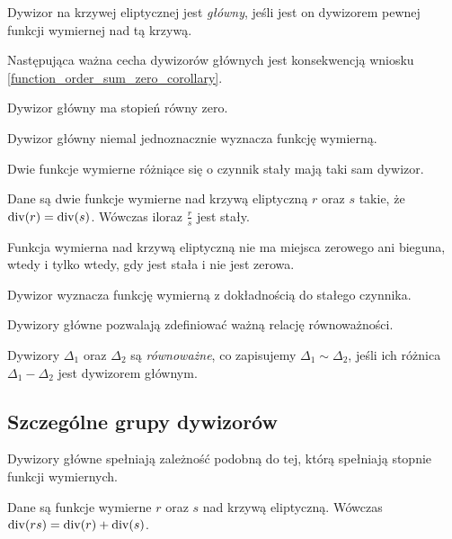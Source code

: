 \begin{definition}
Dywizor na krzywej eliptycznej jest \emph{główny},
jeśli jest on dywizorem pewnej funkcji wymiernej nad tą krzywą.
\end{definition}

Następująca ważna cecha dywizorów głównych
jest konsekwencją wniosku \ref{function_order_sum_zero_corollary}.

\begin{fact}
Dywizor główny ma stopień równy zero.
\end{fact}

Dywizor główny niemal jednoznacznie wyznacza funkcję wymierną.

\begin{fact}
Dwie funkcje wymierne różniące się o czynnik stały mają taki sam dywizor.
\end{fact}

\begin{theorem}
Dane są dwie funkcje wymierne nad krzywą eliptyczną $r$ oraz $s$ takie,
że $\operatorname{div}(r) = \operatorname{div}(s)$.
Wówczas iloraz $\frac{r}{s}$ jest stały.
\end{theorem}

\begin{corollary}
Funkcja wymierna nad krzywą eliptyczną nie ma miejsca zerowego ani bieguna,
wtedy i tylko wtedy, gdy jest stała i nie jest zerowa.
\end{corollary}

\begin{corollary}
Dywizor wyznacza funkcję wymierną z dokładnością do stałego czynnika.
\end{corollary}

Dywizory główne pozwalają zdefiniować ważną relację równoważności.

\begin{definition}
Dywizory $\Delta_1$ oraz $\Delta_2$ są \emph{równoważne},
co zapisujemy $\Delta_1 \sim \Delta_2$,
jeśli ich różnica $\Delta_1 - \Delta_2$ jest dywizorem głównym.
\end{definition}

\subsection*{Szczególne grupy dywizorów}

Dywizory główne spełniają zależność
podobną do tej, którą spełniają stopnie funkcji wymiernych.

\begin{theorem}\label{fun_mul_divi_add_theorem}
Dane są funkcje wymierne $r$ oraz $s$ nad krzywą eliptyczną.
Wówczas $\operatorname{div}(rs) = \operatorname{div}(r) + \operatorname{div}(s)$.
\end{theorem}

